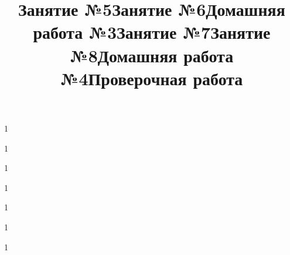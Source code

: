 \newpage
\title{Занятие №5}
\begin{listofex}
	\item 1
\end{listofex}
\newpage
\title{Занятие №6}
\begin{listofex}
	\item 1
\end{listofex}
\newpage
\title{Домашняя работа №3}
\begin{listofex}
	\item 1
\end{listofex}
\newpage
\title{Занятие №7}
\begin{listofex}
	\item 1
\end{listofex}
\newpage
\title{Занятие №8}
\begin{listofex}
	\item 1
\end{listofex}
\newpage
\title{Домашняя работа №4}
\begin{listofex}
	\item 1
\end{listofex}
\newpage
\title{Проверочная работа}
\begin{listofex}
	\item 1
\end{listofex}